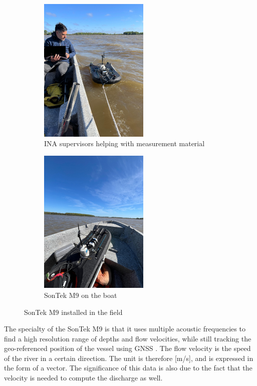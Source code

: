 \begin{figure}[htbp]
    \centering
    \begin{subfigure}[b]{0.48\textwidth}
        \includegraphics[width=\linewidth, height=7cm]{figures/ch4/sonteknico.jpg}
        \caption{INA supervisors helping with measurement material}
        \label{fig:sontek}
    \end{subfigure}
    \hfill
    \begin{subfigure}[b]{0.48\textwidth}
        \includegraphics[width=\linewidth, height=7cm]{figures/ch4/sontek.jpg}
        \caption{SonTek M9 on the boat}
        \label{fig:sontek}
    \end{subfigure}
    \caption{SonTek M9 installed in the field}
    \label{fig:measurement}
\end{figure}

The specialty of the SonTek M9 is that it uses multiple acoustic frequencies to find a high resolution range of depths and flow velocities, while still tracking the geo-referenced position of the vessel using GNSS \autocite{advanced river discharge}. The flow velocity is the speed of the river in a certain direction. The unit is therefore  [m/s], and is expressed in the form of a vector. The significance of this data is also due to the fact that the velocity is needed to compute the discharge as well.

